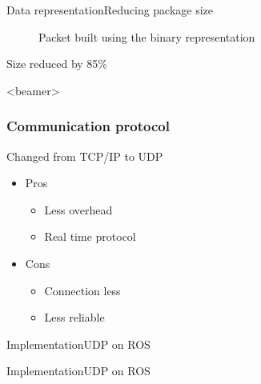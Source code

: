 \begin{frame}{Data representation}{Reducing package size}
\begin{figure}[h]
\begin{minipage}{.45\textwidth}
{\begin{tikzpicture}
  \end{tikzpicture}
  }
  \caption{Packet built using the binary representation}
  \label{fig:new_packets}
\end{minipage}
\end{figure}
\begin{center}
  Size reduced by 85\%
  \end{center}
\end{frame}





\begin{frame}<beamer>
\frametitle{Communication protocol}

Changed from TCP/IP to UDP\vspace{1em}
\begin{itemize}
	\item Pros
	\begin{itemize}
	\item Less overhead
  \item Real time protocol   
	\end{itemize}
  \item Cons
  \begin{itemize}
  \item Connection less 
  \item Less reliable  
\end{itemize}
\end{itemize}
\end{frame}







\begin{frame}{Implementation}{UDP on ROS}

\begin{figure}
\scalebox{0.75}{

}
\end{figure}

\end{frame}




\begin{frame}{Implementation}{UDP on ROS}

\begin{figure}
\scalebox{0.75}{

}
\end{figure}


\end{frame}




